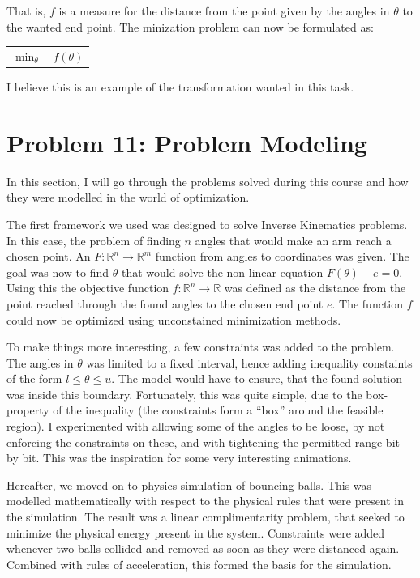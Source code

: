 \documentclass[10pt,oneside,a4paper,final,english]{memoir}
\begin{document}
That is, $f$ is a measure for the distance from the point given by the
angles in $\theta$ to the wanted end point. The minization problem can
now be formulated as:
\begin{center}\begin{tabular}{rl}
$\min_\theta$ & $f(\theta)$
\end{tabular}\end{center}

I believe this is an example of the transformation wanted in this task.


\section{Problem 11: Problem Modeling}
In this section, I will go through the problems solved during this
course and how they were modelled in the world of optimization.

The first framework we used was designed to solve Inverse Kinematics
problems. In this case, the problem of finding $n$ angles that would
make an arm reach a chosen point. An $F : \mathbb{R}^n \to
\mathbb{R}^m$ function from angles to coordinates was given. The goal
was now to find $\theta$ that would solve the non-linear equation
$F(\theta) - e = 0$. Using this the objective function $f :
\mathbb{R}^n \to \mathbb{R}$ was defined as the distance from the
point reached through the found angles to the chosen end point
$e$. The function $f$ could now be optimized using unconstained
minimization methods.

To make things more interesting, a few constraints was added to the
problem. The angles in $\theta$ was limited to a fixed interval, hence
adding inequality constaints of the form $l \leq \theta \leq u$. The
model would have to ensure, that the found solution was inside this
boundary. Fortunately, this was quite simple, due to the box-property
of the inequality (the constraints form a ``box'' around the feasible
region). I experimented with allowing some of the angles to be loose,
by not enforcing the constraints on these, and with tightening the
permitted range bit by bit. This was the inspiration for some very
interesting animations.

Hereafter, we moved on to physics simulation of bouncing balls. This
was modelled mathematically with respect to the physical rules that
were present in the simulation. The result was a linear
complimentarity problem, that seeked to minimize the physical energy
present in the system. Constraints were added whenever two balls
collided and removed as soon as they were distanced again. Combined
with rules of acceleration, this formed the basis for the simulation.
\end{document}
